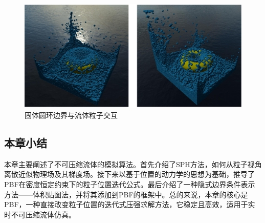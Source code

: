     \begin{figure}
    	\centering
    	\includegraphics[width=.95\textwidth]{figures/simulation/boundary_sample.pdf}
    	\caption{固体圆环边界与流体粒子交互}
    \end{figure}

\subsection{本章小结}
    本章主要阐述了不可压缩流体的模拟算法。首先介绍了SPH方法，如何从粒子视角离散近似物理场及其梯度场。接下来以基于位置的动力学的思想为基础，推导了PBF在密度恒定约束下的粒子位置迭代公式。最后介绍了一种隐式边界条件表示方法——体积贴图法，并将其添加到PBF的框架中。总的来说，本章的核心是PBF，一种直接改变粒子位置的迭代式压强求解方法，它稳定且高效，适用于实时不可压缩流体仿真。